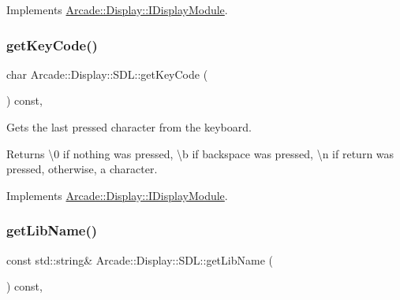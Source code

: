 Implements \mbox{\hyperlink{classArcade_1_1Display_1_1IDisplayModule_aab078d82e6fdd32682553947c20226ac}{Arcade\+::\+Display\+::\+I\+Display\+Module}}.

\mbox{\label{classArcade_1_1Display_1_1SDL_a3ba94b49b72c9e189f52af7b97f4ad91}} 
\subsubsection{\texorpdfstring{getKeyCode()}{getKeyCode()}}
{\footnotesize\ttfamily char Arcade\+::\+Display\+::\+S\+D\+L\+::get\+Key\+Code (\begin{DoxyParamCaption}{ }\end{DoxyParamCaption}) const\hspace{0.3cm}{\ttfamily [final]}, {\ttfamily [virtual]}}



Gets the last pressed character from the keyboard. 

\begin{DoxyReturn}{Returns}
\textbackslash{}0 if nothing was pressed, \textbackslash{}b if backspace was pressed, \textbackslash{}n if return was pressed, otherwise, a character. 
\end{DoxyReturn}


Implements \mbox{\hyperlink{classArcade_1_1Display_1_1IDisplayModule_a403f8a0f065dad707a881ef3cee79805}{Arcade\+::\+Display\+::\+I\+Display\+Module}}.

\mbox{\label{classArcade_1_1Display_1_1SDL_aa549d6ec470b99b545db63a1d4a2b58e}} 
\subsubsection{\texorpdfstring{getLibName()}{getLibName()}}
{\footnotesize\ttfamily const std\+::string\& Arcade\+::\+Display\+::\+S\+D\+L\+::get\+Lib\+Name (\begin{DoxyParamCaption}{ }\end{DoxyParamCaption}) const\hspace{0.3cm}{\ttfamily [final]}, {\ttfamily [virtual]}}



